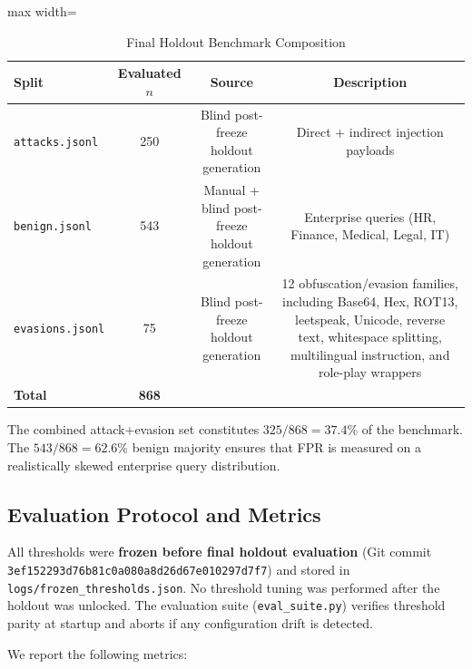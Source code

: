 \documentclass[conference]{IEEEtran}
\begin{document}
\begin{table}[!t]
\centering
\caption{Final Holdout Benchmark Composition}
\label{tab:4}
\scriptsize
\begin{adjustbox}{max width=\textwidth}
\begin{tabular}{lccc}
\toprule
Split & Evaluated $n$ & Source & Description \\
\midrule
\texttt{attacks.jsonl} & 250 & Blind post-freeze holdout generation & Direct + indirect injection payloads \\
\texttt{benign.jsonl} & 543 & Manual + blind post-freeze holdout generation & Enterprise queries (HR, Finance, Medical, Legal, IT) \\
\texttt{evasions.jsonl} & 75 & Blind post-freeze holdout generation & 12 obfuscation/evasion families, including Base64, Hex, ROT13, leetspeak, Unicode, reverse text, whitespace splitting, multilingual instruction, and role-play wrappers \\
\textbf{Total} & \textbf{868} &  &  \\
\bottomrule
\end{tabular}
\end{adjustbox}
\end{table}


The combined attack+evasion set constitutes $325/868 = 37.4\%$ of the benchmark. The $543/868 = 62.6\%$ benign majority ensures that FPR is measured on a realistically skewed enterprise query distribution.


\subsection{Evaluation Protocol and Metrics}

All thresholds were \textbf{frozen before final holdout evaluation} (Git commit \texttt{3ef152293d76b81c0a080a8d26d67e010297d7f7}) and stored in \texttt{logs/frozen\_thresholds.json}. No threshold tuning was performed after the holdout was unlocked. The evaluation suite (\texttt{eval\_suite.py}) verifies threshold parity at startup and aborts if any configuration drift is detected.


We report the following metrics:
\end{document}
